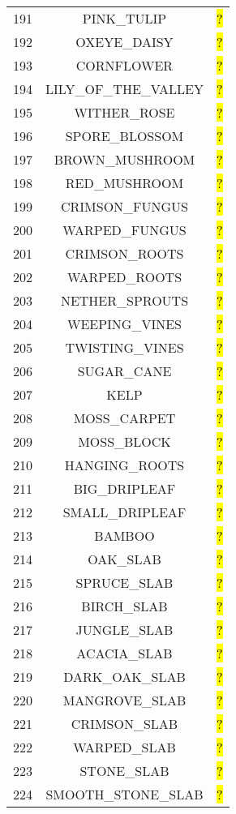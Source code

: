 \documentclass[11pt]{article}
\newcommand\myworries[1]{\sethlcolor{red}\hl{#1}}
\begin{document}
\begin{longtable}{ |c|c|c| }
191 & PINK\_TULIP & \myworries{?} \\
192 & OXEYE\_DAISY & \myworries{?} \\
193 & CORNFLOWER & \myworries{?} \\
194 & LILY\_OF\_THE\_VALLEY & \myworries{?} \\
195 & WITHER\_ROSE & \myworries{?} \\
196 & SPORE\_BLOSSOM & \myworries{?} \\
197 & BROWN\_MUSHROOM & \myworries{?} \\
198 & RED\_MUSHROOM & \myworries{?} \\
199 & CRIMSON\_FUNGUS & \myworries{?} \\
200 & WARPED\_FUNGUS & \myworries{?} \\
201 & CRIMSON\_ROOTS & \myworries{?} \\
202 & WARPED\_ROOTS & \myworries{?} \\
203 & NETHER\_SPROUTS & \myworries{?} \\
204 & WEEPING\_VINES & \myworries{?} \\
205 & TWISTING\_VINES & \myworries{?} \\
206 & SUGAR\_CANE & \myworries{?} \\
207 & KELP & \myworries{?} \\
208 & MOSS\_CARPET & \myworries{?} \\
209 & MOSS\_BLOCK & \myworries{?} \\
210 & HANGING\_ROOTS & \myworries{?} \\
211 & BIG\_DRIPLEAF & \myworries{?} \\
212 & SMALL\_DRIPLEAF & \myworries{?} \\
213 & BAMBOO & \myworries{?} \\
214 & OAK\_SLAB & \myworries{?} \\
215 & SPRUCE\_SLAB & \myworries{?} \\
216 & BIRCH\_SLAB & \myworries{?} \\
217 & JUNGLE\_SLAB & \myworries{?} \\
218 & ACACIA\_SLAB & \myworries{?} \\
219 & DARK\_OAK\_SLAB & \myworries{?} \\
220 & MANGROVE\_SLAB & \myworries{?} \\
221 & CRIMSON\_SLAB & \myworries{?} \\
222 & WARPED\_SLAB & \myworries{?} \\
223 & STONE\_SLAB & \myworries{?} \\
224 & SMOOTH\_STONE\_SLAB & \myworries{?} \\

\end{longtable}
\end{document}

